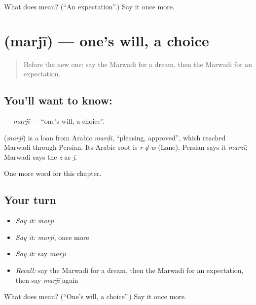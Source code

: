 \begin{tcolorbox}[breakable,colback=teal!4,colframe=teal!35!black,title={Before you move on}]
What does  mean? (\textquotedblleft{}An expectation\textquotedblright{}.) Say it once more.
\end{tcolorbox}
\section[\texorpdfstring{\mw{मरजी} (marjī)}{मरजी (marjī)}]{ (marjī) — one's will, a choice}

\label{lesson:MW-C112-marji}



\begin{quote}
Before the new one: say the Marwadi for a dream, then the Marwadi for an expectation.
\end{quote}

\subsection*{You'll want to know: }
\textbf{} — \emph{marjī} — \textquotedblleft{}one's will, a choice\textquotedblright{}.

\begin{cousinweb}
\textbf{} (\emph{marjī}) is a loan from Arabic \emph{marḍī}, \textquotedblleft{}pleasing, approved\textquotedblright{}, which reached Marwadi through Persian. Its Arabic root is \emph{r-ḍ-w} (Lane). Persian says it \emph{marzī}; Marwadi says the \emph{z} as \emph{j}.
\end{cousinweb}

\begin{grammarlens}[title={What you've built}]
One more word for this chapter.
\end{grammarlens}

\subsection*{Your turn}
\begin{itemize}
\raggedright
  \item \emph{Say it:} \emph{marjī}
  \item \emph{Say it:} \emph{marjī}, once more
  \item \emph{Say it:} say \emph{marjī}
  \item \emph{Recall:} say the Marwadi for a dream, then the Marwadi for an expectation, then say \emph{marjī} again
\end{itemize}

\begin{tcolorbox}[breakable,colback=teal!4,colframe=teal!35!black,title={Before you move on}]
What does  mean? (\textquotedblleft{}One's will, a choice\textquotedblright{}.) Say it once more.
\end{tcolorbox}
